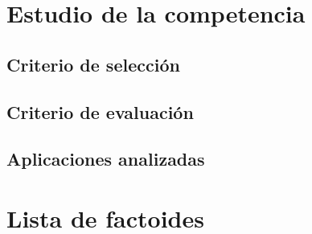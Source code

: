 \documentclass[12pt]{article}
\begin{document}
\section{Estudio de la competencia} %


\subsection{Criterio de selección} %

\subsection{Criterio de evaluación} %

\subsection{Aplicaciones analizadas} %


\section{Lista de factoides}
\end{document}
